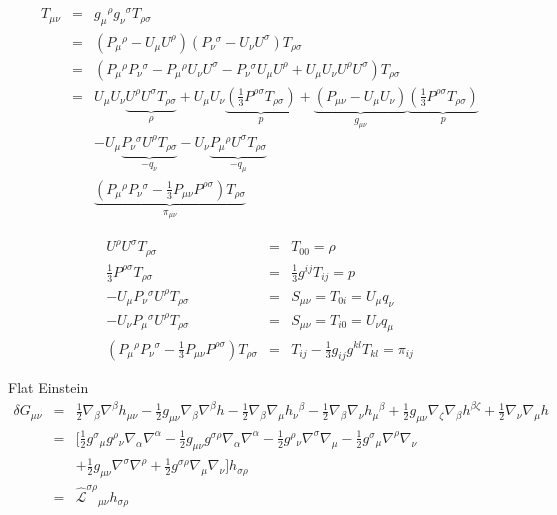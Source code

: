 \documentclass[10pt,letterpaper]{article}
\numberwithin{equation}{section}
\begin{document}
\begin{eqnarray}
T_{\mu\nu} &=& g_{\mu}{}^\rho g_{\nu}{}^\sigma T_{\rho\sigma}
\nonumber\\
&=& ( P_\mu{}^\rho-U_\mu U^\rho)(P_\nu{}^\sigma - U_\nu U^\sigma)T_{\rho\sigma}
\nonumber\\
&=& (P_{\mu}{}^\rho P_\nu{}^\sigma - P_\mu{}^\rho U_\nu U^\sigma - P_{\nu}{}^\sigma U_\mu U^\rho
+U_\mu U_\nu U^\rho U^\sigma)T_{\rho\sigma}
\nonumber\\
&=& U_\mu U_\nu \underbrace{U^\rho U^\sigma T_{\rho\sigma}}_{\rho} +  U_\mu U_\nu \underbrace{\left( \tfrac13 P^{\rho\sigma}T_{\rho\sigma}\right)}_{p}
+ \underbrace{\left( P_{\mu\nu}-U_\mu U_\nu\right)}_{g_{\mu\nu}} \underbrace{\left(\tfrac13 P^{\rho\sigma}T_{\rho\sigma} \right)}_{p}
\nonumber\\
&&
- U_\mu \underbrace{P_\nu{}^\sigma U^\rho T_{\rho\sigma}}_{-q_\nu} - U_\nu \underbrace{P_\mu{}^\rho U^\sigma T_{\rho\sigma}}_{-q_\mu}
\nonumber\\
&& \underbrace{ \left( P_\mu{}^\rho P_\nu{}^\sigma - \tfrac13 P_{\mu\nu} P^{\rho\sigma}\right) T_{\rho\sigma}}_{\pi_{\mu\nu} }
\end{eqnarray}

\begin{eqnarray}
 U^\rho U^\sigma T_{\rho\sigma} &=& T_{00} = \rho 
\nonumber\\
 \frac13 P^{\rho\sigma}T_{\rho\sigma} &=& \frac13 g^{ij}T_{ij} = p 
\nonumber\\
- U_\mu P_\nu{}^\sigma U^\rho T_{\rho\sigma} &=& S_{\mu\nu} = T_{0i} = U_\mu q_\nu
\nonumber\\
- U_\nu P_\mu{}^\sigma U^\rho T_{\rho\sigma} &=& S_{\mu\nu} =  T_{i0} = U_\nu q_\mu 
\nonumber\\
 \left( P_\mu{}^\rho P_\nu{}^\sigma - \tfrac13 P_{\mu\nu} P^{\rho\sigma}\right) T_{\rho\sigma}
&=& T_{ij} - \frac13 g_{ij} g^{kl}T_{kl} = \pi_{ij} 
\end{eqnarray}

\newpage
Flat Einstein
\begin{eqnarray}
\delta G_{\mu\nu} &=& \tfrac{1}{2} \nabla_{\beta}\nabla^{\beta}h_{\mu \nu} -  \tfrac{1}{2} g_{\mu \nu} \nabla_{\beta}\nabla^{\beta}h -  \tfrac{1}{2} \nabla_{\beta}\nabla_{\mu}h_{\nu}{}^{\beta} -  \tfrac{1}{2} \nabla_{\beta}\nabla_{\nu}h_{\mu}{}^{\beta} + \tfrac{1}{2} g_{\mu \nu} \nabla_{\zeta}\nabla_{\beta}h^{\beta \zeta} + \tfrac{1}{2} \nabla_{\nu}\nabla_{\mu}h
\nonumber\\
&=& \bigg[ \tfrac12 g^{\sigma}{}_\mu g^\rho{}_\nu  \nabla_\alpha\nabla^\alpha - \tfrac12 g_{\mu\nu}g^{\sigma\rho}  \nabla_\alpha \nabla^\alpha 
- \tfrac12 g^{\rho}{}_\nu    \nabla^\sigma \nabla_\mu 
- \tfrac12 g^{\sigma}{}_\mu \nabla^\rho \nabla_\nu 
\nonumber\\
&& +\tfrac 12 g_{\mu\nu} \nabla^\sigma \nabla^\rho + \tfrac12 g^{\sigma\rho} \nabla_\mu \nabla_\nu \bigg] h_{\sigma\rho} 
\nonumber\\
&=& \mathcal{\hat L}^{\sigma\rho}{}_{\mu\nu} h_{\sigma\rho}
\end{eqnarray}
\end{document}
